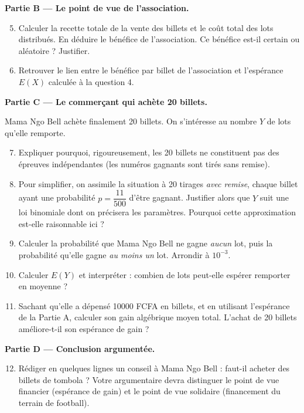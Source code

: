 \documentclass[11pt]{article}
\begin{document}
\textbf{Partie B — Le point de vue de l'association.}

\begin{enumerate}
\setcounter{enumi}{4}
\item Calculer la recette totale de la vente des billets et le coût total des lots distribués. En déduire le bénéfice de l'association. Ce bénéfice est-il certain ou aléatoire ? Justifier.
\item Retrouver le lien entre le bénéfice par billet de l'association et l'espérance $E(X)$ calculée à la question 4.
\end{enumerate}

\textbf{Partie C — Le commerçant qui achète 20 billets.}

Mama Ngo Bell achète finalement 20 billets. On s'intéresse au nombre $Y$ de lots qu'elle remporte.

\begin{enumerate}
\setcounter{enumi}{6}
\item Expliquer pourquoi, rigoureusement, les 20 billets ne constituent pas des épreuves indépendantes (les numéros gagnants sont tirés sans remise).
\item Pour simplifier, on assimile la situation à 20 tirages \emph{avec remise}, chaque billet ayant une probabilité $p = \dfrac{11}{500}$ d'être gagnant. Justifier alors que $Y$ suit une loi binomiale dont on précisera les paramètres. Pourquoi cette approximation est-elle raisonnable ici ?
\item Calculer la probabilité que Mama Ngo Bell ne gagne \emph{aucun} lot, puis la probabilité qu'elle gagne \emph{au moins un} lot. Arrondir à $10^{-3}$.
\item Calculer $E(Y)$ et interpréter : combien de lots peut-elle espérer remporter en moyenne ?
\item Sachant qu'elle a dépensé \num{10000} FCFA en billets, et en utilisant l'espérance de la Partie A, calculer son gain algébrique moyen total. L'achat de 20 billets améliore-t-il son espérance de gain ?
\end{enumerate}

\textbf{Partie D — Conclusion argumentée.}

\begin{enumerate}
\setcounter{enumi}{11}
\item Rédiger en quelques lignes un conseil à Mama Ngo Bell : faut-il acheter des billets de tombola ? Votre argumentaire devra distinguer le point de vue financier (espérance de gain) et le point de vue solidaire (financement du terrain de football).
\end{enumerate}
\end{document}
